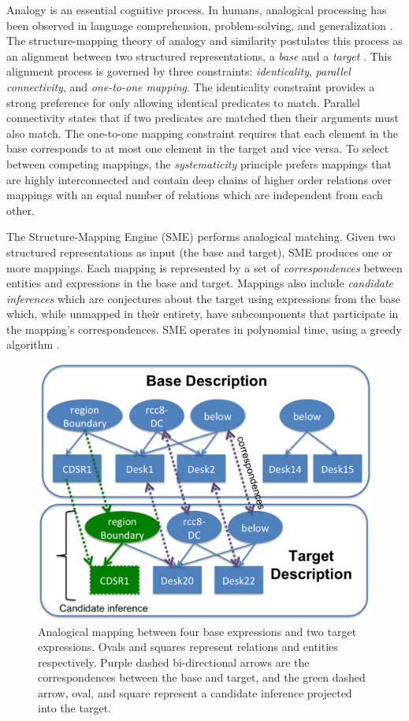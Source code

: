 \documentclass[letterpaper]{article}
\begin{document}
Analogy is an essential cognitive process. In humans, analogical processing has been observed in language comprehension, problem-solving, and generalization \cite{Gentner2003}. The structure-mapping theory of analogy and similarity postulates this process as an alignment between two structured representations, a \textit{base} and a \textit{target} \cite{Gentner1983a}. This alignment process is governed by three constraints: \textit{identicality}, \textit{parallel connectivity}, and \textit{one-to-one mapping}. The identicality constraint provides a strong preference for only allowing identical predicates to match. Parallel connectivity states that if two predicates are matched then their arguments must also match. The one-to-one mapping constraint requires that each element in the base corresponds to at most one element in the target and vice versa. To select between competing mappings, the \textit{systematicity} principle prefers mappings that are highly interconnected and contain deep chains of higher order relations over mappings with an equal number of relations which are independent from each other.

The Structure-Mapping Engine (SME) \cite{Falkenhainer1989a} performs analogical matching. Given two structured representations as input (the base and target), SME produces one or more mappings. Each mapping is represented by a set of \textit{correspondences} between entities and expressions in the base and target.  Mappings also include \textit{candidate inferences} which are conjectures about the target using expressions from the base which, while unmapped in their entirety, have subcomponents that participate in the mapping's correspondences. SME operates in polynomial time, using a greedy algorithm \cite{Forbus/etal1994}.

\begin{figure}[h]
  \includegraphics[width=\columnwidth]{analogy2.png}
  \caption{Analogical mapping between four base expressions and two target expressions. Ovals and squares represent relations and entities respectively. Purple dashed bi-directional arrows are the correspondences between the base and target, and the green dashed arrow, oval, and square represent a candidate inference projected into the target.}
  \label{fig:analogy}
\end{figure}
\end{document}
